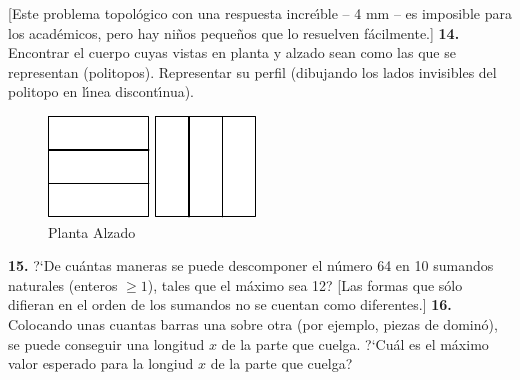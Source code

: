 \documentclass[12pt, spanish]{article}  %
\begin{document}
[Este problema topol\'ogico con una respuesta incre\'{\i}ble -- 4 mm -- es imposible para los acad\'emicos,
 pero hay ni\~nos peque\~nos que lo resuelven f\'acilmente.]  
\newline\newline\quad
{\bf 14.} Encontrar el cuerpo cuyas vistas en planta y alzado sean como las que se representan (politopos).
Representar su perfil (dibujando los lados invisibles del politopo en l\'{\i}nea discont\'{\i}nua).
\begin{figure}[h]
\centering
\footnotesize
\includegraphics[scale=1]{taskbook-99} \qquad\qquad
\includegraphics[scale=1]{taskbook-98}
\\[2pt]
\hspace{1pt} 
Planta
\hspace{43pt} Alzado
\end{figure}
\newline\quad
{\bf 15.} ?`De cu\'antas maneras se puede descomponer el n\'umero 64 en 10 sumandos naturales (enteros $\ge 1$),
tales que el m\'aximo sea 12?
[Las formas que s\'olo difieran en el orden de los sumandos no se cuentan como diferentes.]
\newline\newline\quad
{\bf 16.} Colocando unas cuantas barras una sobre otra (por ejemplo, piezas de domin\'o),
se puede conseguir una longitud $x$ de la parte que cuelga. ?`Cu\'al es el m\'aximo valor esperado para la longiud 
 $x$ de la parte que cuelga?
\end{document}
